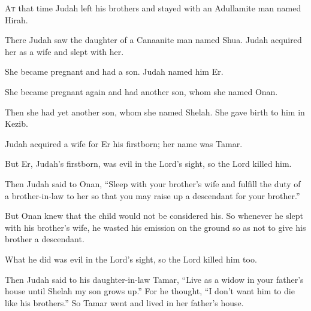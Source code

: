 \begin{scripture}
 \allowchapbreak\hypertarget{ch-genesis-38}{}\lettrine[lines=5]{\color{pentateuch}A}{\textsc{t}} that time Judah left his brothers and stayed with an Adullamite man named Hirah.\everypar{}
 There Judah saw the daughter of a Canaanite man named Shua. Judah acquired her as a wife and slept with her.
 She became pregnant and had a son. Judah named him Er.
 She became pregnant again and had another son, whom she named Onan.
 Then she had yet another son, whom she named Shelah. She gave birth to him in Kezib.
\everypar{}

 Judah acquired a wife for Er his firstborn; her name was Tamar.
 But Er, Judah's firstborn, was evil in the Lord's sight, so the Lord killed him.
\everypar{}

 Then Judah said to Onan, ``Sleep with your brother's wife and fulfill the duty of a brother-in-law to her so that you may raise up a descendant for your brother.''
 But Onan knew that the child would not be considered his. So whenever he slept with his brother's wife, he wasted his emission on the ground so as not to give his brother a descendant.
 What he did was evil in the Lord's sight, so the Lord killed him too.
\everypar{}

 Then Judah said to his daughter-in-law Tamar, ``Live as a widow in your father's house until Shelah my son grows up.'' For he thought, ``I don't want him to die like his brothers.'' So Tamar went and lived in her father's house.
\everypar{}


\end{scripture}
